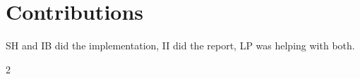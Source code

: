 \documentclass[9pt]{pnas-new}
\begin{document}
\section*{Contributions}
SH and IB did the implementation, II did the report, LP was helping with both.

\begin{multicols}{2}
\section*{\bibname}

\end{multicols}
\end{document}
